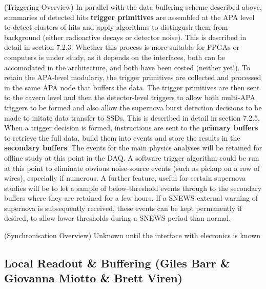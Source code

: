 (Triggering Overview) In parallel with the data buffering scheme
described above, summaries of detected hits {\bf trigger primitives}
are assembled at the APA level to detect clusters of hits and apply
algorithms to distingush them from background (either radioactive
decays or detector noise). This is described in detail in section
7.2.3.  Whether this process is more suitable for FPGAs or computers
is under study, as it depends on the interfaces, both can be
accomodated in the architecture, and both have been costed (neither
yet!).  To retain the APA-level modulariy, the trigger primitives are
collected and processed in the same APA node that buffers the data.
The trigger primitives are then sent to the cavern level and then the
detector-level triggers to allow both multi-APA triggers to be formed
and also allow the supernova burst detection decisions to be made to
initate data transfer to SSDs.  This is described in detail in section
7.2.5.  When a trigger decision is formed, instructions are sent to
the {\bf primary buffers} to retrieve the full data, build them into
events and store the results in the {\bf secondary buffers}.  The
events for the main physics analyses will be retained for offline
study at this point in the DAQ.  A software trigger algorithm could be
run at this point to eliminate obvious noise-source events (such as
pickup on a row of wires), especially if numerous.  A further feature,
useful for certain supernova studies will be to let a sample of
below-threshold events through to the secondary buffers where they are
retained for a few hours.  If a SNEWS external warning of supernova is
subsequently received, these events can be kept permanently if
desired, to allow lower thresholds during a SNEWS period than normal.

(Synchronisation Overview) Unknown until the interface with elecronics is known

\subsection{Local Readout \& Buffering (Giles Barr \& Giovanna Miotto \& Brett Viren)}
\label{sec:fdsp-daq-ltr}


